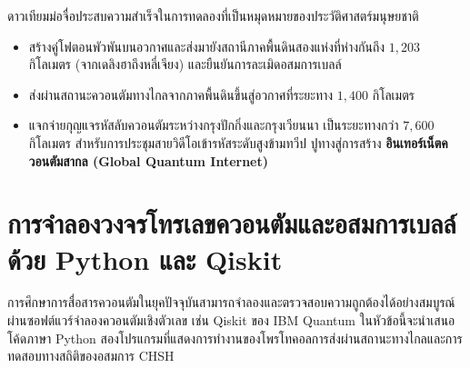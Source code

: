 ดาวเทียมม่อจื่อประสบความสำเร็จในการทดลองที่เป็นหมุดหมายของประวัติศาสตร์มนุษยชาติ
\begin{itemize}
    \item สร้างคู่โฟตอนพัวพันบนอวกาศและส่งมายังสถานีภาคพื้นดินสองแห่งที่ห่างกันถึง $1,203$ กิโลเมตร (จากเดลิงฮาถึงหลี่เจียง) และยืนยันการละเมิดอสมการเบลล์
    \item ส่งผ่านสถานะควอนตัมทางไกลจากภาคพื้นดินขึ้นสู่อวกาศที่ระยะทาง $1,400$ กิโลเมตร
    \item แจกจ่ายกุญแจรหัสลับควอนตัมระหว่างกรุงปักกิ่งและกรุงเวียนนา เป็นระยะทางกว่า $7,600$ กิโลเมตร สำหรับการประชุมสายวิดีโอเข้ารหัสระดับสูงข้ามทวีป ปูทางสู่การสร้าง \textbf{อินเทอร์เน็ตควอนตัมสากล (Global Quantum Internet)}
\end{itemize}

\section{การจำลองวงจรโทรเลขควอนตัมและอสมการเบลล์ด้วย Python และ Qiskit}

การศึกษาการสื่อสารควอนตัมในยุคปัจจุบันสามารถจำลองและตรวจสอบความถูกต้องได้อย่างสมบูรณ์ผ่านซอฟต์แวร์จำลองควอนตัมเชิงตัวเลข เช่น Qiskit ของ IBM Quantum ในหัวข้อนี้จะนำเสนอโค้ดภาษา Python สองโปรแกรมที่แสดงการทำงานของโพรโทคอลการส่งผ่านสถานะทางไกลและการทดสอบทางสถิติของอสมการ CHSH

